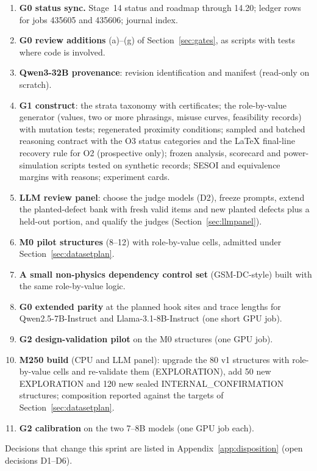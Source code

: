\documentclass[10pt,a4paper]{article}
\begin{document}
\begin{enumerate}
\item \textbf{G0 status sync.} Stage~14 status and roadmap through 14.20; ledger rows for jobs 435605 and 435606;
journal index.
\item \textbf{G0 review additions} (a)--(g) of Section~\ref{sec:gates}, as scripts with tests where code is
involved.
\item \textbf{Qwen3-32B provenance}: revision identification and manifest (read-only on scratch).
\item \textbf{G1 construct}: the strata taxonomy with certificates; the role-by-value generator (values, two or
more phrasings, misuse curves, feasibility records) with mutation tests; regenerated proximity conditions;
sampled and batched reasoning contract with the O3 status categories and the LaTeX final-line recovery rule for
O2 (prospective only); frozen analysis, scorecard and power-simulation scripts tested on synthetic records; SESOI
and equivalence margins with reasons; experiment cards.
\item \textbf{LLM review panel}: choose the judge models (D2), freeze prompts, extend the planted-defect bank with
fresh valid items and new planted defects plus a held-out portion, and qualify the judges (Section~\ref{sec:llmpanel}).
\item \textbf{M0 pilot structures} (8--12) with role-by-value cells, admitted under Section~\ref{sec:datasetplan}.
\item \textbf{A small non-physics dependency control set} (GSM-DC-style) built with the same role-by-value logic.
\item \textbf{G0 extended parity} at the planned hook sites and trace lengths for Qwen2.5-7B-Instruct and
Llama-3.1-8B-Instruct (one short GPU job).
\item \textbf{G2 design-validation pilot} on the M0 structures (one GPU job).
\item \textbf{M250 build} (CPU and LLM panel): upgrade the 80 v1 structures with role-by-value cells and re-validate
them (EXPLORATION), add 50 new EXPLORATION and 120 new sealed INTERNAL\_CONFIRMATION structures; composition
reported against the targets of Section~\ref{sec:datasetplan}.
\item \textbf{G2 calibration} on the two 7--8B models (one GPU job each).
\end{enumerate}

Decisions that change this sprint are listed in Appendix~\ref{app:disposition} (open decisions D1--D6).
\end{document}
